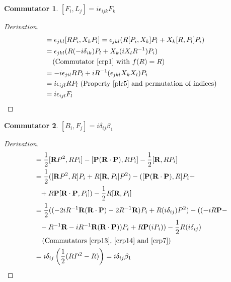 \documentclass[12pt,a4paper]{report}
\theoremstyle{definition}
\newtheorem{commutator}{Commutator}[section]
\newenvironment{derivation}
  {\renewcommand\qedsymbol{$\square$}\begin{proof}[Derivation]}
  {\end{proof}}
\theoremstyle{remark}
\theoremstyle{remark}
\begin{document}
\begin{appendices}
\begin{commutator}\label{cf1}
$[F_i,L_j]=i\epsilon_{ijk}F_k$
\end{commutator}
\begin{derivation}
\begin{align*}
[F_i,L_j]&=\epsilon_{jkl}[RP_i,X_kP_l]=\epsilon_{jkl}(R[P_i,X_k]P_l+X_k[R,P_l]P_i)\\
&=\epsilon_{jkl}(R(-i\delta_{ik})P_l+X_k(iX_lR^{-1})P_i)\\
&\phantom{=} \text{ (Commutator~\ref{crp1} with }f(R)=R)\\
&=-i\epsilon_{jil}RP_l+iR^{-1}(\epsilon_{jkl}X_kX_l)P_i\\
&=i\epsilon_{ijl}RP_l\text{ (Property~\ref{plc5} and permutation of indices)}\\
&=i\epsilon_{ijl}F_l
\end{align*}
\end{derivation}

\begin{commutator}\label{cf2}
$[B_i,F_j]=i\delta_{ij}\beta_1$
\end{commutator}
\begin{derivation}
\begin{align*}
[B_i,F_j]&=\frac{1}{2}[\textbf{R}P^2,RP_i]-[\textbf{P}(\textbf{R}\cdot\textbf{P}),RP_i]-\frac{1}{2}[\textbf{R},RP_i]\\
&=\frac{1}{2}([\textbf{R}P^2,R]P_i+R[\textbf{R},P_i]P^2)-([\textbf{P}(\textbf{R}\cdot\textbf{P}),R]P_i+\\
&\phantom{=}+R\textbf{P}[\textbf{R}\cdot\textbf{P},P_i])-\frac{1}{2}R[\textbf{R},P_i]\\
&=\frac{1}{2}((-2iR^{-1}\textbf{R}(\textbf{R}\cdot\textbf{P})-2R^{-1}\textbf{R})P_i+R(i\delta_{ij})P^2)-((-iR\textbf{P}-\\
&\phantom{=}-R^{-1}\textbf{R}-iR^{-1}\textbf{R}(\textbf{R}\cdot\textbf{P}))P_i+R\textbf{P}(iP_i))-\frac{1}{2}R(i\delta_{ij})\\
&\phantom{=}\text{ (Commutators~\ref{crp13},~\ref{crp14} and~\ref{crp7})}\\
&=i\delta_{ij}\left(\frac{1}{2}(RP^2-R)\right)=i\delta_{ij}\beta_1
\end{align*}
\end{derivation}


\end{appendices}
\end{document}
